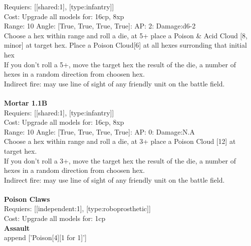 Requiers: [[shared:1], [type:infantry]] \\
Cost: Upgrade all models for: 16cp, 8xp \\


Range: 10  Angle: [True, True, True, True]: AP: 2: Damage:d6-2 \\
Choose a hex within range and roll a die, at 5+ place a Poison \& Acid Cloud [8, minor] at target hex. Place a Poison Cloud[6]  at all hexes surronding that initial hex\\ 
If you don't roll a 5+, move the target hex the result of the die, a number of hexes in a random direction from choosen hex.\\ 
Indirect fire: may use line of sight of any friendly unit on the battle field.\\ 








\ \\
{\bf Mortar 1.1B } \\

Requiers: [[shared:1], [type:infantry]] \\
Cost: Upgrade all models for: 16cp, 8xp \\


Range: 10  Angle: [True, True, True, True]: AP: 0: Damage:N.A \\
Choose a hex within range and roll a die, at 3+ place a Poison Cloud [12] at target hex.\\ 
If you don't roll a 3+, move the target hex the result of the die, a number of hexes in a random direction from choosen hex.\\ 
Indirect fire: may use line of sight of any friendly unit on the battle field.\\ 








\ \\
{\bf Poison Claws } \\

Requiers: [[independent:1], [type:roboprosthetic]] \\
Cost: Upgrade all models for: 1cp \\




{\bf Assault} \ \\

append ['Poison[4][1 for 1]']


